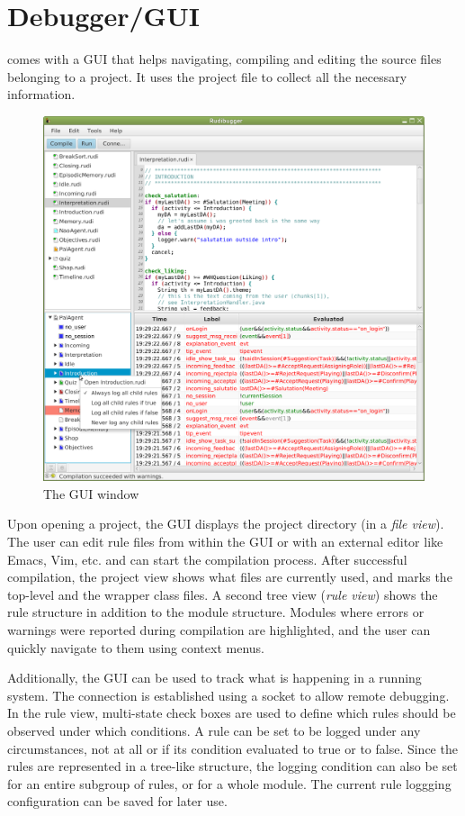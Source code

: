 \section{Debugger/GUI}
\label{sec:debugger}

\vonda comes with a GUI \citep{rudibuggerThesis} that helps navigating, compiling and editing the source
files belonging to a project. It uses the project file to collect all the
necessary information.

\begin{figure}[thb]

  \centering
  \includegraphics[width=.8\textwidth]{VondaGui.png}
  \caption{The \vonda GUI window}
  \label{vondagui}
\end{figure}


Upon opening a project, the GUI displays the project directory (in a
\textit{file view}).  The user can edit rule files from within the GUI or with
an external editor like Emacs, Vim, etc.  and can start the compilation
process. After successful compilation, the project view shows what files are
currently used, and marks the top-level and the wrapper class files. A second
tree view (\emph{rule view}) shows the rule structure in addition to the module
structure. Modules where errors or warnings were reported during compilation
are highlighted, and the user can quickly navigate to them using context menus.


Additionally, the GUI can be used to track what is happening in a running
system. The connection is established using a socket to allow remote debugging.
In the rule view, multi-state check boxes are used to define which rules should
be observed under which conditions. A rule can be set to be logged under any
circumstances, not at all or if its condition evaluated to true or to
false. Since the rules are represented in a tree-like structure, the logging
condition can also be set for an entire subgroup of rules, or for a whole
module. The current rule loggging configuration can be saved for later use.

